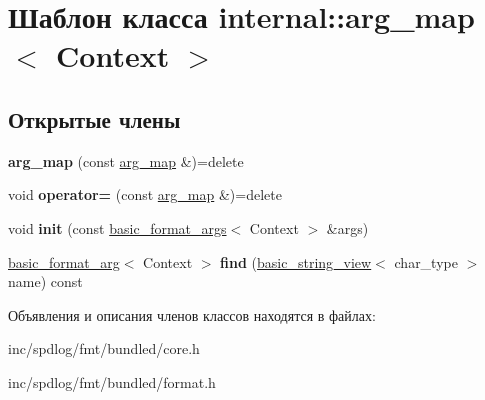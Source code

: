 \hypertarget{classinternal_1_1arg__map}{}\section{Шаблон класса internal\+:\+:arg\+\_\+map$<$ Context $>$}
\label{classinternal_1_1arg__map}
\subsection*{Открытые члены}
\begin{DoxyCompactItemize}
\item 
\mbox{\label{classinternal_1_1arg__map_aeb3d08a06d802ef5824d5477252f1c26}} 
{\bfseries arg\+\_\+map} (const \hyperlink{classinternal_1_1arg__map}{arg\+\_\+map} \&)=delete
\item 
\mbox{\label{classinternal_1_1arg__map_a530997bf4346898def219d2a949af86a}} 
void {\bfseries operator=} (const \hyperlink{classinternal_1_1arg__map}{arg\+\_\+map} \&)=delete
\item 
\mbox{\label{classinternal_1_1arg__map_a8c9b335dab49cad2ea460e7294e19e41}} 
void {\bfseries init} (const \hyperlink{classbasic__format__args}{basic\+\_\+format\+\_\+args}$<$ Context $>$ \&args)
\item 
\mbox{\label{classinternal_1_1arg__map_ae7e3b96f6d27cfac78a8df730eee4b8e}} 
\hyperlink{classbasic__format__arg}{basic\+\_\+format\+\_\+arg}$<$ Context $>$ {\bfseries find} (\hyperlink{classbasic__string__view}{basic\+\_\+string\+\_\+view}$<$ char\+\_\+type $>$ name) const
\end{DoxyCompactItemize}


Объявления и описания членов классов находятся в файлах\+:\begin{DoxyCompactItemize}
\item 
inc/spdlog/fmt/bundled/core.\+h\item 
inc/spdlog/fmt/bundled/format.\+h\end{DoxyCompactItemize}
